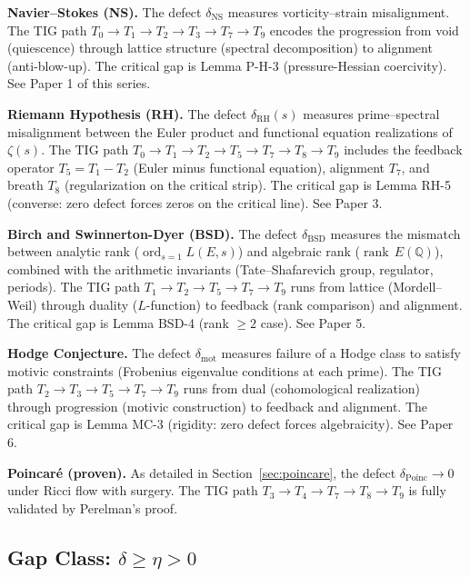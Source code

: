 \documentclass[11pt]{article}
\DeclareMathOperator{\rank}{rank}
\DeclareMathOperator{\ord}{ord}
\begin{document}
\medskip
\noindent
\textbf{Navier--Stokes (NS).}  The defect $\delta_{\mathrm{NS}}$
measures vorticity--strain misalignment.  The TIG path
$T_0 \to T_1 \to T_2 \to T_3 \to T_7 \to T_9$ encodes the
progression from void (quiescence) through lattice structure
(spectral decomposition) to alignment (anti-blow-up).  The critical
gap is Lemma P-H-3 (pressure-Hessian coercivity).
See Paper 1 of this series.

\medskip
\noindent
\textbf{Riemann Hypothesis (RH).}  The defect
$\delta_{\mathrm{RH}}(s)$ measures prime--spectral misalignment
between the Euler product and functional equation realizations of
$\zeta(s)$.  The TIG path
$T_0 \to T_1 \to T_2 \to T_5 \to T_7 \to T_8 \to T_9$ includes
the feedback operator $T_5 = T_1 - T_2$ (Euler minus functional
equation), alignment $T_7$, and breath $T_8$ (regularization on the
critical strip).  The critical gap is Lemma RH-5 (converse: zero
defect forces zeros on the critical line).  See Paper 3.

\medskip
\noindent
\textbf{Birch and Swinnerton-Dyer (BSD).}  The defect
$\delta_{\mathrm{BSD}}$ measures the mismatch between analytic rank
($\ord_{s=1} L(E,s)$) and algebraic rank ($\rank\, E(\mathbb{Q})$),
combined with the arithmetic invariants (Tate--Shafarevich group,
regulator, periods).  The TIG path $T_1 \to T_2 \to T_5 \to T_7
\to T_9$ runs from lattice (Mordell--Weil) through duality
($L$-function) to feedback (rank comparison) and alignment.  The
critical gap is Lemma BSD-4 (rank $\geq 2$ case).  See Paper 5.

\medskip
\noindent
\textbf{Hodge Conjecture.}  The defect $\delta_{\mathrm{mot}}$
measures failure of a Hodge class to satisfy motivic constraints
(Frobenius eigenvalue conditions at each prime).  The TIG path
$T_2 \to T_3 \to T_5 \to T_7 \to T_9$ runs from dual (cohomological
realization) through progression (motivic construction) to feedback
and alignment.  The critical gap is Lemma MC-3 (rigidity: zero defect
forces algebraicity).  See Paper 6.

\medskip
\noindent
\textbf{Poincar\'e (proven).}  As detailed in
Section~\ref{sec:poincare}, the defect $\delta_{\mathrm{Poinc}} \to 0$
under Ricci flow with surgery.  The TIG path
$T_3 \to T_4 \to T_7 \to T_8 \to T_9$ is fully validated by
Perelman's proof.

\subsection{Gap Class: $\delta \geq \eta > 0$}
\label{subsec:gap}
\end{document}

